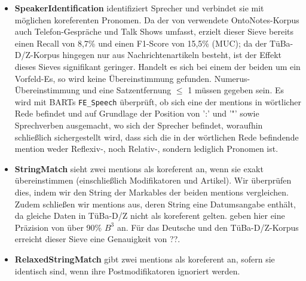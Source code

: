 \documentclass{scrartcl}
\begin{document}
\begin{itemize}

\item \textbf{SpeakerIdentification} identifiziert Sprecher und verbindet sie mit möglichen koreferenten Pronomen. Da der von  verwendete OntoNotes-Korpus auch Telefon-Gespräche und Talk Shows umfasst, erzielt dieser Sieve bereits einen Recall von 8,7\% und einen F1-Score von 15,5\% (MUC); da der TüBa-D/Z-Korpus hingegen nur aus Nachrichtenartikeln besteht, ist der Effekt dieses Sieves signifikant geringer. Handelt es sich bei einem der beiden um ein Vorfeld-Es, so wird keine Übereinstimmung gefunden. Numerus-Übereinstimmung und eine Satzentfernung ${\leq}$ 1 müssen gegeben sein. Es wird mit BARTs \texttt{FE\_Speech} überprüft, ob sich eine der mentions in wörtlicher Rede befindet und auf Grundlage der Position von ':' und '"' sowie Sprechverben ausgemacht, wo sich der Sprecher befindet, woraufhin schließlich sichergestellt wird, dass sich die in der wörtlichen Rede befindende mention weder Reflexiv-, noch Relativ-, sondern lediglich Pronomen ist.

\item \textbf{StringMatch} sieht zwei mentions als koreferent an, wenn sie exakt übereinstimmen (einschließlich Modifikatoren und Artikel). Wir überprüfen dies, indem wir den String der Markables der beiden mentions vergleichen. Zudem schließen wir mentions aus, deren String eine Datumsangabe enthält, da gleiche Daten in TüBa-D/Z nicht als koreferent gelten. geben hier eine Präzision von über 90\% $B^3$ an. Für das Deutsche und den TüBa-D/Z-Korpus erreicht dieser Sieve eine Genauigkeit von ??.

\item \textbf{RelaxedStringMatch} gibt zwei mentions als koreferent an, sofern sie identisch sind, wenn ihre Postmodifikatoren ignoriert werden.


\end{itemize}
\end{document}
